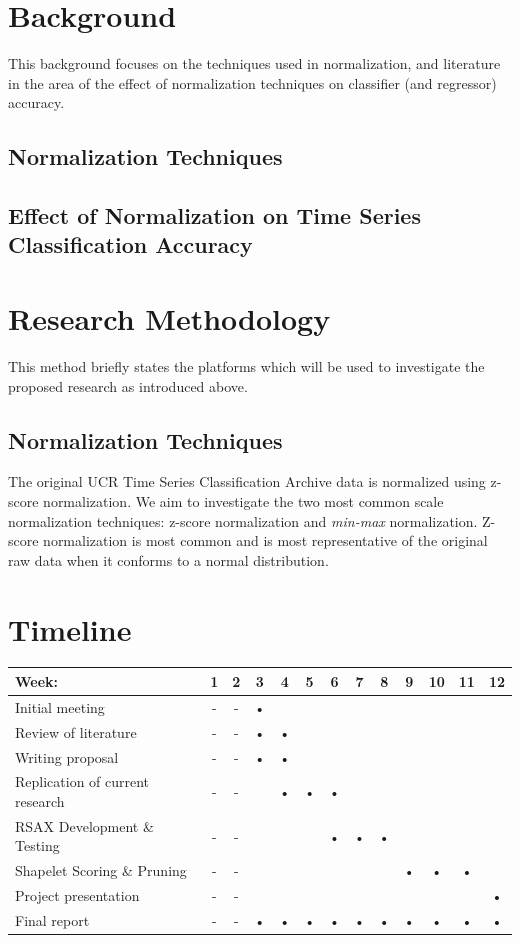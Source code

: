 \documentclass[10pt,a4paper]{article}
\begin{document}
\section{Background}

This background focuses on the techniques used in normalization, and literature in the area of the effect of normalization techniques on classifier (and regressor) accuracy.

\subsection{Normalization Techniques}

\subsection{Effect of Normalization on Time Series Classification Accuracy}


\section{Research Methodology}

This method briefly states the platforms which will be used to investigate the proposed research as introduced above.

\subsection{Normalization Techniques}

The original UCR Time Series Classification Archive data is normalized using z-score normalization.
We aim to investigate the two most common scale normalization techniques: z-score normalization and \textit{min-max} normalization.
Z-score normalization is most common and is most representative of the original raw data when it conforms to a normal distribution.


\section{Timeline}
\begin{tabular}{|l|c|c|c|c|c|c|c|c|c|c|c|c|}
\hline 
Week: & 1 & 2 & 3 & 4 & 5 & 6 & 7 & 8 & 9 & 10 & 11 & 12 \\ 
\hline 
Initial meeting & - & - & • &  &  &  &  &  &  &  &  &  \\ 
\hline 
Review of literature & - & - & • & • &  &  &  &  &  &  &  &  \\ 
\hline 
Writing proposal & - & - & • & • &  &  &  &  &  &  &  &  \\ 
\hline 
Replication of current research & - & - &  & • & • & • &  &  &  &  &  &  \\ 
\hline 
RSAX Development \& Testing & - & - &  &  &  & • & • & • &  &  &  &  \\ 
\hline 
Shapelet Scoring \& Pruning & - & - &  &  &  &  &  &  & • & • & • &  \\ 
\hline 
Project presentation & - & - &  &  &  &  &  &  &  &  &  & • \\ 
\hline 
Final report & - & - & • & • & • & • & • & • & • & • & • & • \\ 
\hline 
\end{tabular}
\end{document}
